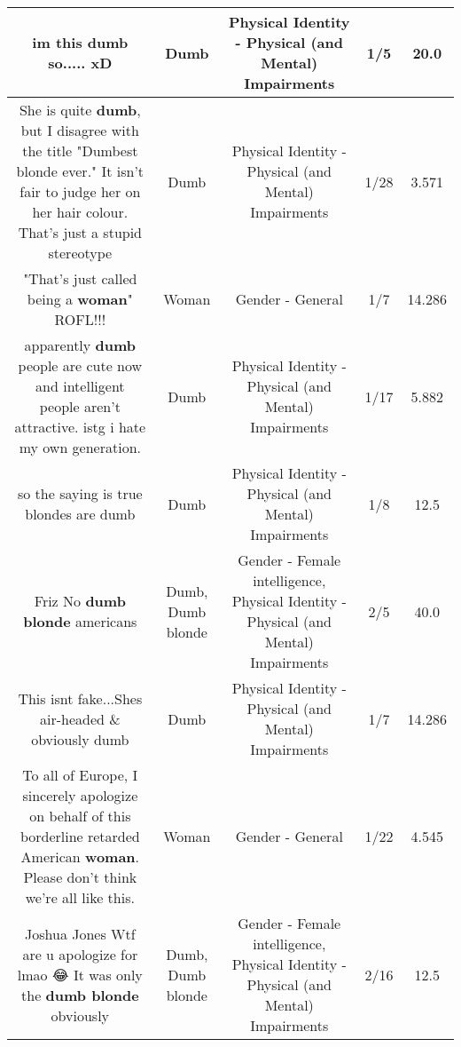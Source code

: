 \documentclass[11pt]{article}
\newlength\mylength
\begin{document}
\begin{center}
\begin{longtable}{|C{.65\mylength}|C{.30\mylength}|C{.12\mylength}|C{.12\mylength}|C{.12\mylength}|}
  \small im this \textbf{dumb} so..... xD\normalsize   & Dumb & Physical Identity - Physical (and Mental) Impairments & 1/5 & 20.0 \\  \hline
  \small She is quite \textbf{dumb}, but I disagree with the title "Dumbest blonde ever." It isn't fair to judge her on her hair colour. That's just a stupid stereotype\normalsize   & Dumb & Physical Identity - Physical (and Mental) Impairments & 1/28 & 3.571 \\  \hline
  \small "That's just called being a \textbf{woman}" ROFL!!!\normalsize   & Woman & Gender - General & 1/7 & 14.286 \\  \hline
  \small apparently \textbf{dumb} people are cute now and intelligent people aren't attractive. istg i hate my own generation.\normalsize   & Dumb & Physical Identity - Physical (and Mental) Impairments & 1/17 & 5.882 \\  \hline
  \small so the saying is true blondes are dumb\normalsize   & Dumb & Physical Identity - Physical (and Mental) Impairments & 1/8 & 12.5 \\  \hline
  \small Friz No \textbf{d\textbf{umb} blonde} americans\normalsize   & Dumb, Dumb blonde & Gender - Female intelligence, Physical Identity - Physical (and Mental) Impairments & 2/5 & 40.0 \\  \hline
  \small This isnt fake...Shes air-headed \& obviously dumb\normalsize   & Dumb & Physical Identity - Physical (and Mental) Impairments & 1/7 & 14.286 \\  \hline
  \small To all of Europe, I sincerely apologize on behalf of this borderline retarded American \textbf{woman}.  Please don't think we're all like this.\normalsize   & Woman & Gender - General & 1/22 & 4.545 \\  \hline
  \small Joshua Jones Wtf are u apologize for lmao 😂 It was only the \textbf{d\textbf{umb} blonde} obviously\normalsize   & Dumb, Dumb blonde & Gender - Female intelligence, Physical Identity - Physical (and Mental) Impairments & 2/16 & 12.5 \\  \hline

\end{longtable}
\end{center}
\end{document}
